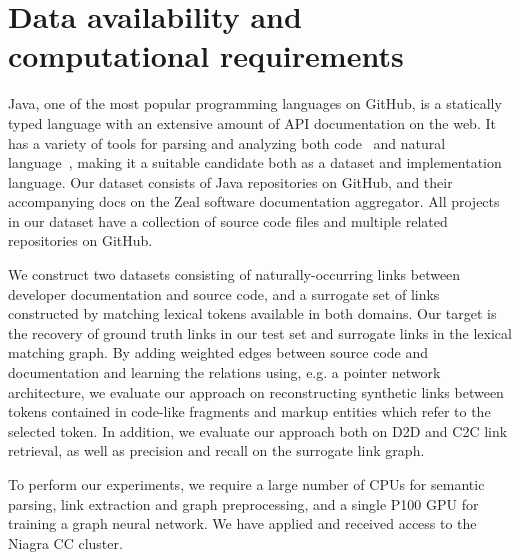 \documentclass{article}
\begin{document}
\section{Data availability and computational requirements}

Java, one of the most popular programming languages on GitHub, is a statically typed language with an extensive amount of API documentation on the web. It has a variety of tools for parsing and analyzing both code~\citep{kovalenko2019pathminer} and natural language~\citep{manning2014stanford, grella2018non}, making it a suitable candidate both as a dataset and implementation language. Our dataset consists of Java repositories on GitHub, and their accompanying docs on the Zeal software documentation aggregator. All projects in our dataset have a collection of source code files and multiple related repositories on GitHub.

We construct two datasets consisting of naturally-occurring links between developer documentation and source code, and a surrogate set of links constructed by matching lexical tokens available in both domains. Our target is the recovery of ground truth links in our test set and surrogate links in the lexical matching graph. By adding weighted edges between source code and documentation and learning the relations using, e.g. a pointer network architecture, we evaluate our approach on reconstructing synthetic links between tokens contained in code-like fragments and markup entities which refer to the selected token. In addition, we evaluate our approach both on D2D and C2C link retrieval, as well as precision and recall on the surrogate link graph.

To perform our experiments, we require a large number of CPUs for semantic parsing, link extraction and graph preprocessing, and a single P100 GPU for training a graph neural network. We have applied and received access to the Niagra CC cluster.



\end{document}

